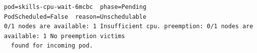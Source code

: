 \begin{Verbatim}[fontsize=\scriptsize]
pod=skills-cpu-wait-6mcbc  phase=Pending
PodScheduled=False  reason=Unschedulable
0/1 nodes are available: 1 Insufficient cpu. preemption: 0/1 nodes are available: 1 No preemption victims
  found for incoming pod.
\end{Verbatim}
